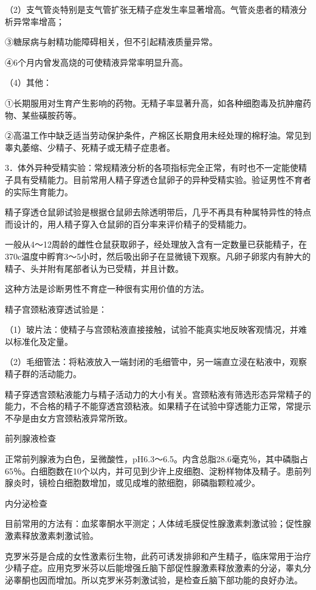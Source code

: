 \documentclass[12pt,UTF8]{ctexbook}
\begin{document}
（2）支气管炎特别是支气管扩张无精子症发生率显著增高。气管炎患者的精液分析异常率增高；

③糖尿病与射精功能障碍相关，但不引起精液质量异常。

④6个月内曾发高烧的可使精液异常率明显升高。

（4）其他：

①长期服用对生育产生影响的药物。无精子率显著升高，如各种细胞毒及抗肿瘤药物、某些磺胺药等。

②高温工作中缺乏适当劳动保护条件，产棉区长期食用未经处理的棉籽油。常见到睾丸萎缩、少精子、死精子或无精子症患者。

3．体外异种受精实验：常规精液分析的各项指标完全正常，有时也不一定能使精子具有受精能力。目前常用人精子穿透仓鼠卵子的异种受精实验。验证男性不育者的实际生育能力。

精子穿透仓鼠卵试验是根据仓鼠卵去除透明带后，几乎不再具有种属特异性的特点而设计的，用人精子穿入仓鼠卵的百分率来评价精子的受精能力。

一般从4～12周龄的雌性仓鼠获取卵子，经处理放入含有一定数量已获能精子，在370c温度中孵育3～5小时，然后吸出卵子在显微镜下观察。凡卵子卵浆内有肿大的精子、头并附有尾部者认为已受精，并且计数。

这种方法是诊断男性不育症一种很有实用价值的方法。

精子宫颈粘液穿透试验是：

（1）玻片法：使精子与宫颈粘液直接接触，试验不能真实地反映客观情况，并难以标准化及定量。

（2）毛细管法：将粘液放入一端封闭的毛细管中，另一端直立浸在粘液中，观察精子群的活动能力。

精子穿透宫颈粘液能力与精子活动力的大小有关。宫颈粘液有筛选形态异常精子的能力，不合格的精子不能穿透宫颈粘液。如果精子在试验中穿透能力正常，常提示不孕是由女方宫颈粘液异常所致。

前列腺液检查

正常前列腺液为白色，呈微酸性，pH6.3～6.5。内含总脂28.6毫克％，其中磷脂占65％。白细胞数在10个以内，并可见到少许上皮细胞、淀粉样物体及精子。患前列腺炎时，镜检白细胞数增加，或见成堆的脓细胞，卵磷脂颗粒减少。

内分泌检查

目前常用的方法有：血浆睾酮水平测定；人体绒毛膜促性腺激素刺激试验；促性腺激素释放激素刺激试验。

克罗米芬是合成的女性激素衍生物，此药可诱发排卵和产生精子，临床常用于治疗少精子症。应用克罗米芬以后能增强丘脑下部促性腺激素释放激素的分泌，睾丸分泌睾酮也因而增加。所以克罗米芬刺激试验，是检查丘脑下部功能的良好办法。
\end{document}
